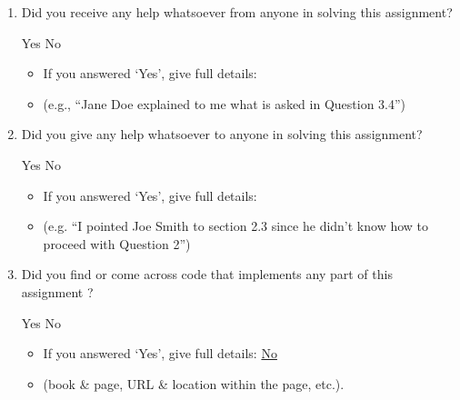 \documentclass[11pt,addpoints,answers]{exam}
\numberwithin{equation}{section} %
\numberwithin{figure}{section} %
\numberwithin{table}{section} %
\begin{document}
\begin{enumerate}
    \item Did you receive any help whatsoever from anyone in solving this assignment?
    \begin{checkboxes}
     \choice Yes
     \choice No
    \end{checkboxes}
    \begin{itemize}
        \item If you answered `Yes', give full details:
        \item (e.g., “Jane Doe explained to me what is asked in Question 3.4”)
    \end{itemize}

    \begin{tcolorbox}[fit,height=2cm,blank, borderline={1pt}{-2pt},nobeforeafter]
    \end{tcolorbox}

    \item Did you give any help whatsoever to anyone in solving this assignment?
    \begin{checkboxes}
     \choice Yes
     \choice No
    \end{checkboxes}
    \begin{itemize}
        \item If you answered `Yes', give full details:
        \item (e.g. “I pointed Joe Smith to section 2.3 since he didn’t know how to proceed with Question 2”)
    \end{itemize}

    \begin{tcolorbox}[fit,height=2cm,blank, borderline={1pt}{-2pt},nobeforeafter]
    \end{tcolorbox}

    \item Did you find or come across code that implements any part of this assignment ? 
    \begin{checkboxes}
     \choice Yes
     \choice No
    \end{checkboxes}
    \begin{itemize}
        \item If you answered `Yes', give full details: \underline{No}
        \item (book \& page, URL \& location within the page, etc.).
    \end{itemize}
    \begin{tcolorbox}[fit,height=2cm,blank, borderline={1pt}{-2pt},nobeforeafter]
    \end{tcolorbox}
\end{enumerate}
\end{document}

